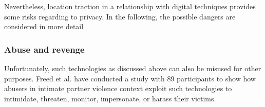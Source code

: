 
Nevertheless, location traction in a relationship with digital techniques provides some risks regarding to privacy. In the following, the possible dangers are considered in more detail

\subsubsection{Abuse and revenge}
Unfortunately, such technologies as discussed above can also be misused for other purposes. Freed et al. \cite{freed2018stalker} have conducted a study with 89 participants to show how abusers in intimate partner violence context exploit such technologies to intimidate, threaten, monitor, impersonate, or harass their victims.

%
%
%
%





